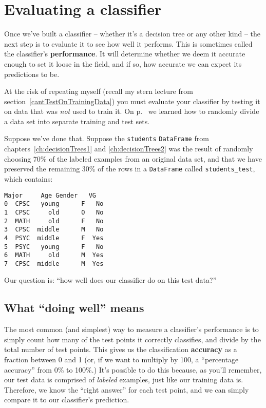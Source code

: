 
\chapter{Evaluating a classifier}


Once we've built a classifier -- whether it's a decision tree or any other kind
-- the next step is to evaluate it to see how well it performs. This is
sometimes called the classifier's \textbf{performance}. It will determine
whether we deem it accurate enough to set it loose in the field, and if so, how
accurate we can expect its predictions to be.

At the risk of repeating myself (recall my stern lecture from
section~\ref{cantTestOnTrainingData}) you must evaluate your classifier by
testing it on data that was \textit{not} used to train it. On
p.~\pageref{sampleRows} we learned how to randomly divide a data set into
separate training and test sets.

Suppose we've done that. Suppose the \texttt{students} \texttt{DataFrame} from
chapters~\ref{ch:decisionTrees1} and \ref{ch:decisionTrees2} was the result of
randomly choosing 70\% of the labeled examples from an original data set, and
that we have preserved the remaining 30\% of the rows in a \texttt{DataFrame}
called \texttt{students\_test}, which contains:

\begin{Verbatim}[fontsize=\small,samepage=true,frame=single,framesep=3mm,xleftmargin=4.2cm,xrightmargin=4.1cm]
  Major     Age Gender   VG
0  CPSC   young      F   No
1  CPSC     old      O   No
2  MATH     old      F   No
3  CPSC  middle      M   No
4  PSYC  middle      F  Yes
5  PSYC   young      F   No
6  MATH     old      M  Yes
7  CPSC  middle      M  Yes
\end{Verbatim}

Our question is: ``how well does our classifier do on this test data?''

\section{What ``doing well'' means}


The most common (and simplest) way to measure a classifier's performance is to
simply count how many of the test points it correctly classifies, and divide by
the total number of test points. This gives us the classification
\textbf{accuracy} as a fraction between 0 and 1 (or, if we want to multiply by
100, a ``percentage accuracy'' from 0\% to 100\%.) It's possible to do this
because, as you'll remember, our test data is comprised of \textit{labeled}
examples, just like our training data is. Therefore, we know the ``right
answer'' for each test point, and we can simply compare it to our classifier's
prediction.

